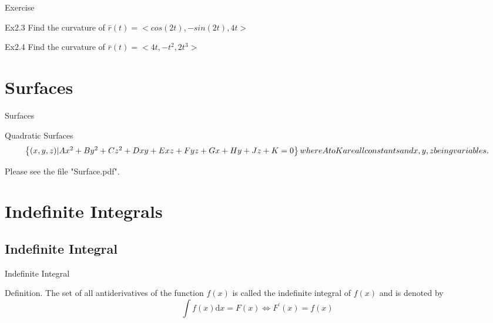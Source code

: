 \documentclass{beamer}
\begin{document}
    \begin{frame}[t]{Exercise}
        \par \textcolor{yy}{Ex2.3} Find the curvature of $\bar{r}(t)=<cos(2t),-sin(2t),4t>$\\
        \par \textcolor{yy}{Ex2.4} Find the curvature of $\bar{r}(t)=<4t,-t^{2},2t^3>$\\
    \end{frame}

 
\section{Surfaces}
    
    
    \begin{frame}{Surfaces}
    \par \textcolor{yy}{Quadratic Surfaces}
    \begin{equation*}
        \begin{Bmatrix}
        {(x,y,z) | Ax^2 + By^2 + Cz^2 + Dxy + Exz + Fyz + Gx + Hy + Jz + K = 0}
        \end{Bmatrix}\\
        where A to K are all constants and x, y, z being variables.
    \end{equation*}
    \par Please see the file "Surface.pdf".
    \end{frame}
 
\section{Indefinite Integrals}
    

    \subsection{Indefinite Integral}
    \begin{frame}[t]{Indefinite Integral}
        \begin{block}
            \par \textcolor{yy}{Definition.} The set of all antiderivatives of the function $f(x)$ is called the \textcolor{yy}{indefinite integral} of $f(x)$ and is denoted by $$\int f(x) \mathrm{d}x=F(x) \Leftrightarrow F^{\prime}(x)=f(x)$$
        \end{block}
    \end{frame}
\end{document}
